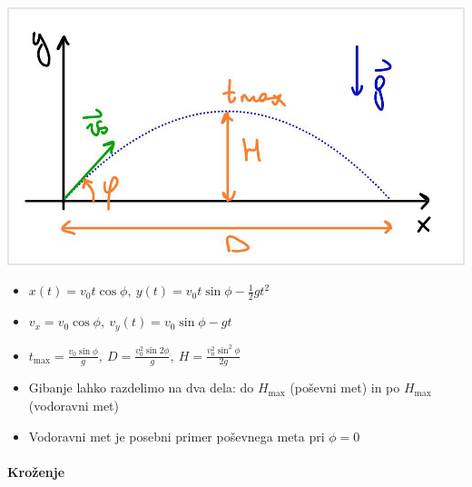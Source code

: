 \begin{minipage}[t]{0.35\textwidth}
    \vspace{0pt}
  \includegraphics[width=\linewidth]{img/01_002.jpg} 
\end{minipage}
\hfill
\begin{minipage}[t]{0.60\textwidth}
    \vspace{0pt}
    \begin{itemize}
        \item \(x(t) = v_0 t \cos \phi, \ y(t) = v_0 t \sin \phi - \frac{1}{2}gt^2\)
        \item \(v_x = v_0 \cos \phi, \ v_y(t) = v_0 \sin \phi - gt\)
        \item \(\boxed{t_\text{max} = \frac{v_0 \sin \phi}{g}, \ D = \frac{v_0^2 \sin 2 \phi}{g}, \ H = \frac{v_0^2\sin^2 \phi}{2g}}\)
        \item Gibanje lahko razdelimo na dva dela: do \(H_\text{max}\) (poševni met) in po \(H_\text{max}\) (vodoravni met)
        \item Vodoravni met je posebni primer poševnega meta pri \(\phi = 0\)
    \end{itemize}
\end{minipage}
%
\paragraph{Kroženje}
\ 

